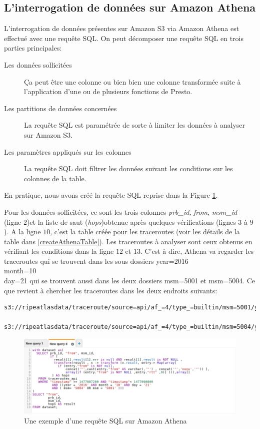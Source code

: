 \subsection{L'interrogation de données sur Amazon Athena}

L'interrogation de données présentes sur Amazon S3 via Amazon Athena est effectué avec une requête SQL. On peut décomposer une requête SQL en trois parties principales:

\begin{description}
\item[Les données sollicitées] Ça peut être une colonne ou bien bien une colonne transformée suite à l'application d'une ou de plusieurs fonctions de Presto.
\item[Les partitions de données concernées] La requête SQL est paramétrée de sorte à limiter les données à analyser sur Amazon S3. 
\item[Les paramètres appliqués sur les colonnes] La requête SQL doit filtrer les données suivant les conditions sur les colonnes de la table.
\end{description}
En pratique, nous avons créé la requête SQL reprise dans la Figure \ref{fig:sqlrequestathena}. 


Pour les données sollicitées, ce sont les trois colonnes \textit{prb\_id}, \textit{from}, \textit{msm\_id} (ligne $2$)et la liste de saut (\textit{hops})obtenue après quelques vérifications (lignes $3$ à $9$). A la ligne $10$, c'est la table créée pour les traceroutes (voir les détails de la table dans \ref{createAthenaTable}). Les traceroutes à analyser sont ceux obtenus en vérifiant les conditions dans la ligne  $12$ et $13$. C'est à dire, Athena va regarder les traceroutes qui se trouvent dans les sous dossiers year=2016\\month=10\\day=21 qui se trouvent aussi dans les deux dossiers msm=5001 et msm=5004. Ce que revient à chercher les traceroutes dans les deux endroits suivants:

\begin{lstlisting}[basicstyle= \footnotesize]
s3://ripeatlasdata/traceroute/source=api/af_=4/type_=builtin/msm=5001/year=2016/month=10/day=21

s3://ripeatlasdata/traceroute/source=api/af_=4/type_=builtin/msm=5004/year=2016/month=10/day=21
\end{lstlisting}



\begin{figure}[H]
	\centering
	\includegraphics[width=1\linewidth]{illustrations/sqlRequestAthena.png}
	\caption{Une exemple d'une requête SQL sur Amazon Athena}
	\label{fig:sqlrequestathena}
\end{figure}



